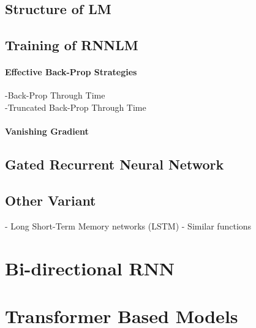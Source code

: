 		\subsection{Structure of LM}

		\subsection{Training of RNNLM}

				\paragraph*{Effective Back-Prop Strategies}

					-Back-Prop Through Time\\
					-Truncated Back-Prop Through Time

				\paragraph*{Vanishing Gradient}

		\subsection{Gated Recurrent Neural Network}

		\subsection{Other Variant}

				- Long Short-Term Memory networks (LSTM)
				- Similar functions
	\section{Bi-directional RNN}

	\section{Transformer Based Models}





		
